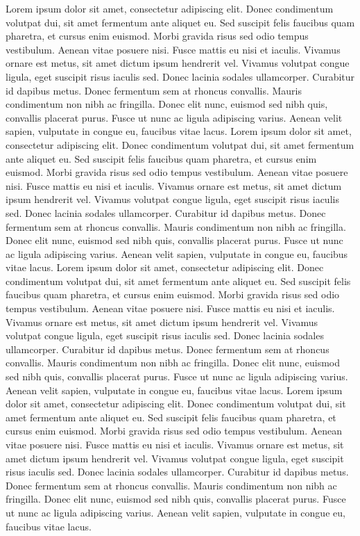 \documentclass{CorpusOmne}
\begin{document}
\begin{COcolumn}
Lorem ipsum dolor sit amet, consectetur adipiscing elit. Donec condimentum volutpat dui, sit amet fermentum ante aliquet eu. Sed suscipit felis faucibus quam pharetra, et cursus enim euismod. Morbi gravida risus sed odio tempus vestibulum. Aenean vitae posuere nisi. Fusce mattis eu nisi et iaculis. Vivamus ornare est metus, sit amet dictum ipsum hendrerit vel. Vivamus volutpat congue ligula, eget suscipit risus iaculis sed. Donec lacinia sodales ullamcorper. Curabitur id dapibus metus. Donec fermentum sem at rhoncus convallis. Mauris condimentum non nibh ac fringilla. Donec elit nunc, euismod sed nibh quis, convallis placerat purus. Fusce ut nunc ac ligula adipiscing varius. Aenean velit sapien, vulputate in congue eu, faucibus vitae lacus. Lorem ipsum dolor sit amet, consectetur adipiscing elit. Donec condimentum volutpat dui, sit amet fermentum ante aliquet eu. Sed suscipit felis faucibus quam pharetra, et cursus enim euismod. Morbi gravida risus sed odio tempus vestibulum. Aenean vitae posuere nisi. Fusce mattis eu nisi et iaculis. Vivamus ornare est metus, sit amet dictum ipsum hendrerit vel. Vivamus volutpat congue ligula, eget suscipit risus iaculis sed. Donec lacinia sodales ullamcorper. Curabitur id dapibus metus. Donec fermentum sem at rhoncus convallis. Mauris condimentum non nibh ac fringilla. Donec elit nunc, euismod sed nibh quis, convallis placerat purus. Fusce ut nunc ac ligula adipiscing varius. Aenean velit sapien, vulputate in congue eu, faucibus vitae lacus.
Lorem ipsum dolor sit amet, consectetur adipiscing elit. Donec condimentum volutpat dui, sit amet fermentum ante aliquet eu. Sed suscipit felis faucibus quam pharetra, et cursus enim euismod. Morbi gravida risus sed odio tempus vestibulum. Aenean vitae posuere nisi. Fusce mattis eu nisi et iaculis. Vivamus ornare est metus, sit amet dictum ipsum hendrerit vel. Vivamus volutpat congue ligula, eget suscipit risus iaculis sed. Donec lacinia sodales ullamcorper. Curabitur id dapibus metus. Donec fermentum sem at rhoncus convallis. Mauris condimentum non nibh ac fringilla. Donec elit nunc, euismod sed nibh quis, convallis placerat purus. Fusce ut nunc ac ligula adipiscing varius. Aenean velit sapien, vulputate in congue eu, faucibus vitae lacus. Lorem ipsum dolor sit amet, consectetur adipiscing elit. Donec condimentum volutpat dui, sit amet fermentum ante aliquet eu. Sed suscipit felis faucibus quam pharetra, et cursus enim euismod. Morbi gravida risus sed odio tempus vestibulum. Aenean vitae posuere nisi. Fusce mattis eu nisi et iaculis. Vivamus ornare est metus, sit amet dictum ipsum hendrerit vel. Vivamus volutpat congue ligula, eget suscipit risus iaculis sed. Donec lacinia sodales ullamcorper. Curabitur id dapibus metus. Donec fermentum sem at rhoncus convallis. Mauris condimentum non nibh ac fringilla. Donec elit nunc, euismod sed nibh quis, convallis placerat purus. Fusce ut nunc ac ligula adipiscing varius. Aenean velit sapien, vulputate in congue eu, faucibus vitae lacus.
\end{COcolumn}
\vfill
\end{document}
